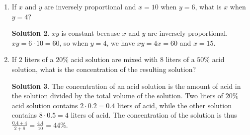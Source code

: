 \documentclass{article}
\theoremstyle{definition}
\newtheorem*{solution}{Solution}
\begin{document}
\begin{enumerate}
\begin{solution}
            of yarn. Now, if we divide her total length of yarn by the inches of
            yarn used per inch of scarf, we see that with the amount of yarn
            Kathleen has, she can make a scarf that has length
            $\frac{15876}{184.5} \approx 86$ inches long.
        \end{solution}
        \item If $x$ and $y$ are inversely proportional and $x = 10$ when $y =
        6$, what is $x$ when $y = 4$?
        \begin{solution}
            $xy$ is constant because $x$ and $y$ are inversely proportional. $xy
            = 6 \cdot 10 = 60$, so when $y = 4$, we have $xy = 4x = 60$ and $x =
            15$.
        \end{solution}
        \item If $2$ liters of a $20\%$ acid solution are mixed with $8$ liters
        of a $50\%$ acid solution, what is the concentration of the resulting
        solution?
        \begin{solution}
            The concentration of an acid solution is the amount of acid in the
            solution divided by the total volume of the solution. Two liters of
            $20\%$ acid solution contains $2 \cdot 0.2 = 0.4$ liters of acid,
            while the other solution contains $8 \cdot 0.5 = 4$ liters of acid.
            The concentration of the solution is thus $\frac{0.4 + 4}{2 + 8} =
            \frac{4.4}{10} = 44\%$.
        \end{solution}
    \end{enumerate}
\end{document}
